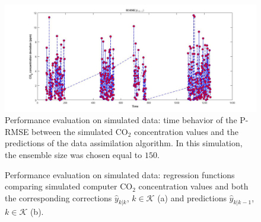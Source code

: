 \documentclass[journal]{IEEEtran}
\begin{document}
\begin{figure}[tbp]
		\hspace{-10mm}   
	\includegraphics[scale=.22]{figure/montecarlo_q150_np1_error_2.jpg}
	\caption{Performance evaluation on simulated data: time behavior of the P-RMSE between the simulated CO$_2$ concentration values and the predictions of the data assimilation algorithm.
	In this simulation, the ensemble size was chosen equal to $150$.}
	\label{fig:rmse_pred_error_q150monte}
\end{figure}
\begin{figure}[tbp]
\hspace*{-1cm} 
	\centering
	\hfil
\hspace*{-1cm} 
	\caption{Performance evaluation on simulated data:  regression functions comparing simulated computer CO$_2$ concentration values and both the corresponding corrections $\hat{y}_{k|k}$, $k \in \mathcal{K}$ (a) and predictions $\hat{y}_{k|k-1}$, $k \in \mathcal{K}$ (b).}
	\label{fig:regression_q150_monte}
\end{figure}
\end{document}
